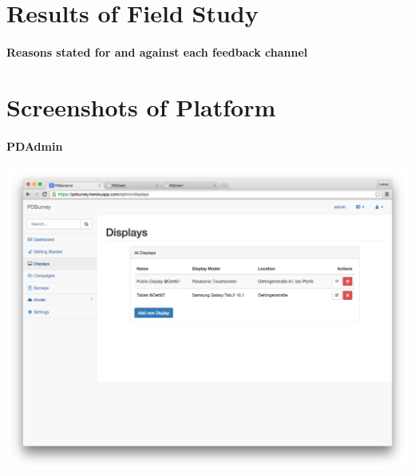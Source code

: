   \label{appendix:interview-participant}
  

  \label{appendix:interview-passerby}
  

  \label{appendix:semi-structured-interview}
  


\clearpage
\section{Results of Field Study}


  \paragraph{Reasons stated for and against each feedback channel}

  



\clearpage
\section{Screenshots of Platform}




\paragraph{PDAdmin}


 \label{screenshot:pdadmin-displays}
    \begin{center}
        \includegraphics[width=\columnwidth]{img/screenshots/pdadmin/displays.png}
    \end{center}


